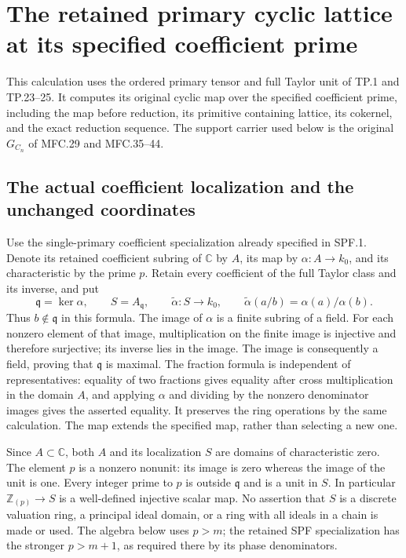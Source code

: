 \section{The retained primary cyclic lattice at its specified coefficient prime}
\label{CFStage:sec:tcl}

This calculation uses the ordered primary tensor and full Taylor unit
of TP.1 and TP.23--25. It computes its original cyclic map over the
specified coefficient prime, including the map before reduction, its
primitive containing lattice, its cokernel, and the exact reduction
sequence. The support carrier used below is the original
\(G_{C_n}\) of MFC.29 and MFC.35--44.

\subsection{The actual coefficient localization and the unchanged coordinates}

Use the single-primary coefficient specialization already specified
in SPF.1. Denote its retained coefficient subring of \(\mathbb C\)
by \(A\), its map by \(\alpha:A\to k_0\), and its characteristic
by the prime \(p\). Retain every coefficient of the full Taylor
class and its inverse, and put
\[
 \mathfrak q=\ker\alpha,\qquad S=A_{\mathfrak q},\qquad
 \widetilde\alpha:S\longrightarrow k_0,\qquad
 \widetilde\alpha(a/b)=\alpha(a)/\alpha(b).
 \tag{TCL.1}\label{CFStage:eq:tcl-ring}
\]
Thus \(b\notin\mathfrak q\) in this formula. The image of
\(\alpha\) is a finite subring of a field. For each nonzero element
of that image, multiplication on the finite image is injective and
therefore surjective; its inverse lies in the image. The image is
consequently a field, proving that \(\mathfrak q\) is maximal.
The fraction formula is independent of representatives: equality
of two fractions gives equality after cross multiplication in
the domain \(A\), and applying \(\alpha\) and dividing by the
nonzero denominator images gives the asserted equality.
It preserves the ring operations by the same calculation.
The map extends the specified map, rather than selecting a new one.

Since \(A\subset\mathbb C\), both \(A\) and its localization
\(S\) are domains of characteristic zero. The element \(p\) is
a nonzero nonunit: its image is zero whereas the image of the unit
is one. Every integer prime to \(p\) is outside \(\mathfrak q\)
and is a unit in \(S\). In particular \(\mathbb Z_{(p)}\to S\)
is a well-defined injective scalar map. No assertion that \(S\)
is a discrete valuation ring, a principal ideal domain, or a ring
with all ideals in a chain is made or used. The algebra below uses
\(p>m\); the retained SPF specialization has the stronger
\(p>m+1\), as required there by its phase denominators.

